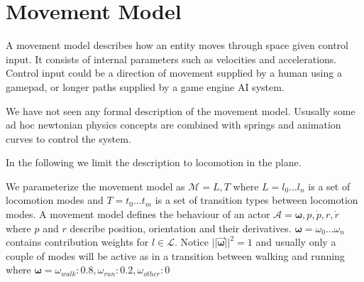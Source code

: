 \section{Movement Model}
A movement model describes how an entity moves through space given control input. It consists of internal parameters such as velocities and accelerations. Control input could be a direction of movement supplied by a human using a gamepad, or longer paths supplied by a game engine AI system.

We have not seen any formal description of the movement model. Ususally some ad hoc newtonian physics concepts are combined with springs and animation curves to control the system.

In the following we limit the description to locomotion in the plane. 

We parameterize the movement model as $\mathcal{M}=L,T$ where $L=l_0 \ldots l_n$ is a set of locomotion modes and $T=t_0 \ldots t_m$ is a set of transition types between locomotion modes. A movement model defines the behaviour of an actor $\mathcal{A}=\boldsymbol{\omega},p,\dot{p},r,\dot{r}$ where $p$ and $r$ describe position, orientation and their derivatives.  $\boldsymbol{\omega}=\omega_0 \ldots \omega_n$ contains contribution weights for $l \in \mathcal{L}$. Notice $||\vec{\boldsymbol{\omega}}||^2=1$ and usually only a couple of modes will be active as in a transition between walking and running where $\boldsymbol{\omega}=\omega_{walk}:0.8, \omega_{run}:{0.2}, \omega_{other}:0$

